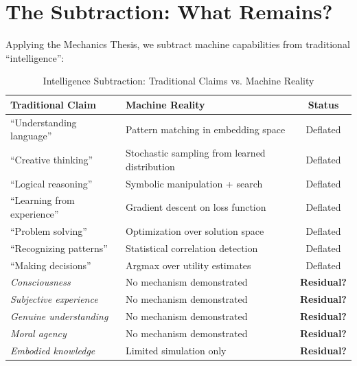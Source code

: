 \section{The Subtraction: What Remains?}
\label{sec:hi-subtraction}

Applying the Mechanics Thesis, we subtract machine capabilities from traditional ``intelligence'':

\begin{table}[htbp]
\centering
\caption{Intelligence Subtraction: Traditional Claims vs. Machine Reality}
\label{tab:hi-subtraction}
\renewcommand{\arraystretch}{1.4}
\begin{tabular}{@{}p{4cm}p{4cm}c@{}}
\toprule
\textbf{Traditional Claim} & \textbf{Machine Reality} & \textbf{Status} \\
\midrule
``Understanding language'' & Pattern matching in embedding space & Deflated \\
``Creative thinking'' & Stochastic sampling from learned distribution & Deflated \\
``Logical reasoning'' & Symbolic manipulation + search & Deflated \\
``Learning from experience'' & Gradient descent on loss function & Deflated \\
``Problem solving'' & Optimization over solution space & Deflated \\
``Recognizing patterns'' & Statistical correlation detection & Deflated \\
``Making decisions'' & Argmax over utility estimates & Deflated \\
\midrule
\textit{Consciousness} & No mechanism demonstrated & \textbf{Residual?} \\
\textit{Subjective experience} & No mechanism demonstrated & \textbf{Residual?} \\
\textit{Genuine understanding} & No mechanism demonstrated & \textbf{Residual?} \\
\textit{Moral agency} & No mechanism demonstrated & \textbf{Residual?} \\
\textit{Embodied knowledge} & Limited simulation only & \textbf{Residual?} \\
\bottomrule
\end{tabular}
\end{table}


